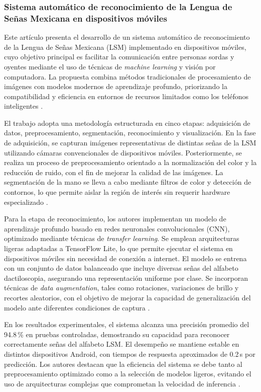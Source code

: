 	\subsubsection{Sistema automático de reconocimiento de la Lengua de Señas Mexicana en dispositivos móviles}
	
	Este artículo presenta el desarrollo de un sistema automático de reconocimiento de la Lengua de Señas Mexicana (LSM) implementado en dispositivos móviles, cuyo objetivo principal es facilitar la comunicación entre personas sordas y oyentes mediante el uso de técnicas de \textit{machine learning} y visión por computadora. La propuesta combina métodos tradicionales de procesamiento de imágenes con modelos modernos de aprendizaje profundo, priorizando la compatibilidad y eficiencia en entornos de recursos limitados como los teléfonos inteligentes \cite{mendoza2025lsm_mobile}.
	
	El trabajo adopta una metodología estructurada en cinco etapas: adquisición de datos, preprocesamiento, segmentación, reconocimiento y visualización. En la fase de adquisición, se capturan imágenes representativas de distintas señas de la LSM utilizando cámaras convencionales de dispositivos móviles. Posteriormente, se realiza un proceso de preprocesamiento orientado a la normalización del color y la reducción de ruido, con el fin de mejorar la calidad de las imágenes. La segmentación de la mano se lleva a cabo mediante filtros de color y detección de contornos, lo que permite aislar la región de interés sin requerir hardware especializado \cite{mendoza2025lsm_mobile}.
	
	Para la etapa de reconocimiento, los autores implementan un modelo de aprendizaje profundo basado en redes neuronales convolucionales (CNN), optimizado mediante técnicas de \textit{transfer learning}. Se emplean arquitecturas ligeras adaptadas a TensorFlow Lite, lo que permite ejecutar el sistema en dispositivos móviles sin necesidad de conexión a internet. El modelo se entrena con un conjunto de datos balanceado que incluye diversas señas del alfabeto dactiloscopia, asegurando una representación uniforme por clase. Se incorporan técnicas de \textit{data augmentation}, tales como rotaciones, variaciones de brillo y recortes aleatorios, con el objetivo de mejorar la capacidad de generalización del modelo ante diferentes condiciones de captura \cite{mendoza2025lsm_mobile}.
	
	En los resultados experimentales, el sistema alcanza una precisión promedio del 94.8\,\% en pruebas controladas, demostrando su capacidad para reconocer correctamente señas del alfabeto LSM. El desempeño se mantiene estable en distintos dispositivos Android, con tiempos de respuesta aproximados de 0.2\,s por predicción. Los autores destacan que la eficiencia del sistema se debe tanto al preprocesamiento optimizado como a la selección de modelos ligeros, evitando el uso de arquitecturas complejas que comprometan la velocidad de inferencia \cite{mendoza2025lsm_mobile}.
	
